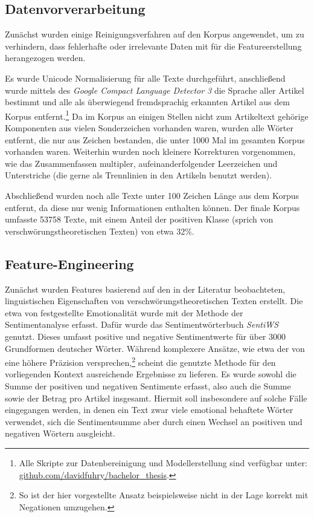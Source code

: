 \subsection{Datenvorverarbeitung}

Zunächst wurden einige Reinigungsverfahren auf den Korpus angewendet, um zu verhindern, dass fehlerhafte oder irrelevante Daten mit für die Featureerstellung herangezogen werden.

Es wurde Unicode Normalisierung für alle Texte durchgeführt, anschließend wurde mittels des \textit{Google Compact Language Detector 3} \parencite[][]{cld3} die Sprache aller Artikel bestimmt und alle als überwiegend fremdsprachig erkannten Artikel aus dem Korpus entfernt.\footnote{Alle Skripte zur Datenbereinigung und Modellerstellung sind verfügbar unter: \\ \href{https://github.com/davidfuhry/bachelor_thesis}{github.com/davidfuhry/bachelor\_thesis}.}
Da im Korpus an einigen Stellen nicht zum Artikeltext gehörige Komponenten aus vielen Sonderzeichen vorhanden waren, wurden alle Wörter entfernt, die nur aus Zeichen bestanden, die unter 1000 Mal im gesamten Korpus vorhanden waren.
Weiterhin wurden noch kleinere Korrekturen vorgenommen, wie das Zusammenfassen multipler, aufeinanderfolgender Leerzeichen und Unterstriche (die gerne als Trennlinien in den Artikeln benutzt werden).

Abschließend wurden noch alle Texte unter 100 Zeichen Länge aus dem Korpus entfernt, da diese nur wenig Informationen enthalten können. Der finale Korpus umfasste 53758 Texte, mit einem Anteil der positiven Klasse (sprich von verschwörungstheoretischen Texten) von etwa 32\%.

\subsection{Feature-Engineering}

Zunächst wurden Features basierend auf den in der Literatur beobachteten, linguistischen Eigenschaften von verschwörungstheoretischen Texten erstellt.
Die etwa von \textcite*[10]{miller_2002} festgestellte Emotionalität wurde mit der Methode der Sentimentanalyse erfasst.
Dafür wurde das Sentimentwörterbuch \textit{SentiWS} \parencite[][]{sentiws} genutzt.
Dieses umfasst positive und negative Sentimentwerte für über 3000 Grundformen deutscher Wörter.
Während komplexere Ansätze, wie etwa der von \textcite[]{ml_sentiment} eine höhere Präzision versprechen,\footnote{So ist der hier vorgestellte Ansatz beispielsweise nicht in der Lage korrekt mit Negationen umzugehen.} scheint die genutzte Methode für den vorliegenden Kontext ausreichende Ergebnisse zu lieferen.
Es wurde sowohl die Summe der positiven und negativen Sentimente erfasst, also auch die Summe sowie der Betrag pro Artikel insgesamt.
Hiermit soll insbesondere auf solche Fälle eingegangen werden, in denen ein Text zwar viele emotional behaftete Wörter verwendet, sich die Sentimentsumme aber durch einen Wechsel an positiven und negativen Wörtern ausgleicht.

